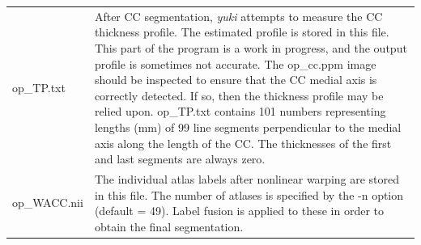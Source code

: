 \documentclass[11pt]{article}
\begin{document}
\begin{longtable}{p{}p{}}
op\_TP.txt & After CC segmentation, {\it yuki} attempts to measure the CC thickness profile.
The estimated profile is stored in this file.  This part of the program is a work in progress,
and the output profile is sometimes not accurate.  The op\_cc.ppm image should be inspected
to ensure that the CC medial axis is correctly detected.  If so, then the thickness profile
may be relied upon.  op\_TP.txt contains 101 numbers representing lengths (mm) of 99 line
segments perpendicular to the medial axis along the length of the CC. The thicknesses of the first
and last  segments are always zero.\\

op\_WACC.nii & The individual atlas labels after nonlinear warping are stored in this file.  The number
of atlases is specified by the -n option (default = 49). Label fusion is applied to these in order
to obtain the final segmentation.  \\

\end{longtable}
\end{document}
